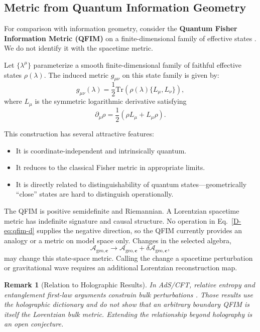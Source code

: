 \documentclass[12pt,a4paper,openany]{book}
\newtheorem{remark}[theorem]{Remark}
\begin{document}
\subsection{Metric from Quantum Information Geometry}

For comparison with information geometry, consider the \textbf{Quantum Fisher Information Metric (QFIM)} on a finite-dimensional family of effective states \cite{Petz1996,Bengtsson2006}.  We do not identify it with the spacetime metric.

Let $\{\lambda^\mu\}$ parameterize a smooth finite-dimensional family of faithful effective states $\rho(\lambda)$. The induced metric $g_{\mu\nu}$ on this state family is given by:
\begin{equation}
g_{\mu\nu}(\lambda) = \frac{1}{2} \text{Tr}\left( \rho(\lambda) \{ L_\mu, L_\nu \} \right),
\label{D-eq:qfim-d}
\end{equation}
where $L_\mu$ is the symmetric logarithmic derivative satisfying
\begin{equation}
\partial_\mu \rho = \frac{1}{2}(\rho L_\mu + L_\mu \rho).
\end{equation}

This construction has several attractive features:
\begin{itemize}
    \item It is coordinate-independent and intrinsically quantum.
    \item It reduces to the classical Fisher metric in appropriate limits.
    \item It is directly related to distinguishability of quantum states—geometrically ``close'' states are hard to distinguish operationally.
\end{itemize}

The QFIM is positive semidefinite and Riemannian.  A Lorentzian spacetime metric has indefinite signature and causal structure.  No operation in Eq.~\eqref{D-eq:qfim-d} supplies the negative direction, so the QFIM currently provides an analogy or a metric on model space only.  Changes in the selected algebra,
\begin{equation}
\mathcal{A}_{\mathrm{geo},\mathbf{c}} \to \mathcal{A}_{\mathrm{geo},\mathbf{c}} + \delta\mathcal{A}_{\mathrm{geo},\mathbf{c}},
\end{equation}
may change this state-space metric.  Calling the change a spacetime perturbation or gravitational wave requires an additional Lorentzian reconstruction map.

\begin{remark}[Relation to Holographic Results]
In AdS/CFT, relative entropy and entanglement first-law arguments constrain bulk perturbations \cite{Lashkari2014,Faulkner2014}.  Those results use the holographic dictionary and do not show that an arbitrary boundary QFIM is itself the Lorentzian bulk metric.  Extending the relationship beyond holography is an open conjecture.
\end{remark}
\end{document}
